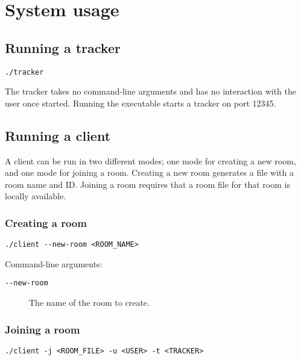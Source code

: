 \documentclass[12pt, a4paper]{article}
\begin{document}
\section{System usage}
\label{sec:usage}

\subsection{Running a tracker}
\label{sec:run-tracker}

\begin{lstlisting}[numbers=none]
./tracker
\end{lstlisting}

The tracker takes no command-line arguments and has no interaction with the user once started. Running the executable starts a tracker on port 12345.

\subsection{Running a client}
\label{sec:run-client}

A client can be run in two different modes; one mode for creating a new room, and one mode for joining a room. Creating a new room generates a file with a room name and ID. Joining a room requires that a room file for that room is locally available. %

\subsubsection{Creating a room}
\label{sec:new-room}

\begin{lstlisting}[numbers=none]
./client --new-room <ROOM_NAME>
\end{lstlisting}

Command-line arguments:
\begin{description}
\item[\texttt{-{}-new-room}] The name of the room to create.
\end{description}

\subsubsection{Joining a room}

\begin{lstlisting}[numbers=none]
./client -j <ROOM_FILE> -u <USER> -t <TRACKER>
\end{lstlisting}
\end{document}
